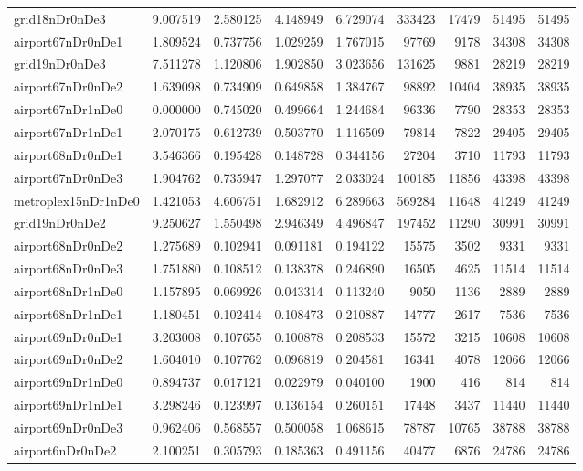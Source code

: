 \documentclass[../../../thesis.tex]{subfiles}
\begin{document}
\begin{longtable}{|l|r|r|r|r|r|r|r|r|}
grid18nDr0nDe3 & 9.007519 & 2.580125 & 4.148949 & 6.729074 & 333423 & 17479 & 51495 & 51495 \\
airport67nDr0nDe1 & 1.809524 & 0.737756 & 1.029259 & 1.767015 & 97769 & 9178 & 34308 & 34308 \\
grid19nDr0nDe3 & 7.511278 & 1.120806 & 1.902850 & 3.023656 & 131625 & 9881 & 28219 & 28219 \\
airport67nDr0nDe2 & 1.639098 & 0.734909 & 0.649858 & 1.384767 & 98892 & 10404 & 38935 & 38935 \\
airport67nDr1nDe0 & 0.000000 & 0.745020 & 0.499664 & 1.244684 & 96336 & 7790 & 28353 & 28353 \\
airport67nDr1nDe1 & 2.070175 & 0.612739 & 0.503770 & 1.116509 & 79814 & 7822 & 29405 & 29405 \\
airport68nDr0nDe1 & 3.546366 & 0.195428 & 0.148728 & 0.344156 & 27204 & 3710 & 11793 & 11793 \\
airport67nDr0nDe3 & 1.904762 & 0.735947 & 1.297077 & 2.033024 & 100185 & 11856 & 43398 & 43398 \\
metroplex15nDr1nDe0 & 1.421053 & 4.606751 & 1.682912 & 6.289663 & 569284 & 11648 & 41249 & 41249 \\
grid19nDr0nDe2 & 9.250627 & 1.550498 & 2.946349 & 4.496847 & 197452 & 11290 & 30991 & 30991 \\
airport68nDr0nDe2 & 1.275689 & 0.102941 & 0.091181 & 0.194122 & 15575 & 3502 & 9331 & 9331 \\
airport68nDr0nDe3 & 1.751880 & 0.108512 & 0.138378 & 0.246890 & 16505 & 4625 & 11514 & 11514 \\
airport68nDr1nDe0 & 1.157895 & 0.069926 & 0.043314 & 0.113240 & 9050 & 1136 & 2889 & 2889 \\
airport68nDr1nDe1 & 1.180451 & 0.102414 & 0.108473 & 0.210887 & 14777 & 2617 & 7536 & 7536 \\
airport69nDr0nDe1 & 3.203008 & 0.107655 & 0.100878 & 0.208533 & 15572 & 3215 & 10608 & 10608 \\
airport69nDr0nDe2 & 1.604010 & 0.107762 & 0.096819 & 0.204581 & 16341 & 4078 & 12066 & 12066 \\
airport69nDr1nDe0 & 0.894737 & 0.017121 & 0.022979 & 0.040100 & 1900 & 416 & 814 & 814 \\
airport69nDr1nDe1 & 3.298246 & 0.123997 & 0.136154 & 0.260151 & 17448 & 3437 & 11440 & 11440 \\
airport69nDr0nDe3 & 0.962406 & 0.568557 & 0.500058 & 1.068615 & 78787 & 10765 & 38788 & 38788 \\
airport6nDr0nDe2 & 2.100251 & 0.305793 & 0.185363 & 0.491156 & 40477 & 6876 & 24786 & 24786 \\

\end{longtable}
\end{document}
